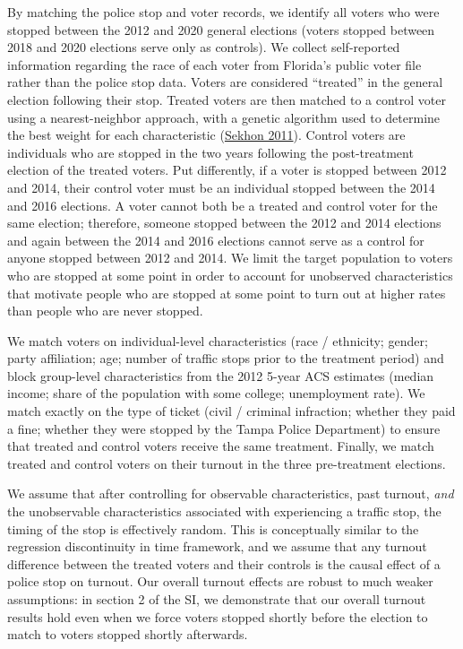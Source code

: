 \documentclass[
  12pt,
]{article}
\begin{document}
By matching the police stop and voter records, we identify all voters who were stopped between the 2012 and 2020 general elections (voters stopped between 2018 and 2020 elections serve only as controls). We collect self-reported information regarding the race of each voter from Florida's public voter file rather than the police stop data. Voters are considered ``treated'' in the general election following their stop. Treated voters are then matched to a control voter using a nearest-neighbor approach, with a genetic algorithm used to determine the best weight for each characteristic (\protect\hyperlink{ref-Sekhon2011}{Sekhon 2011}). Control voters are individuals who are stopped in the two years following the post-treatment election of the treated voters. Put differently, if a voter is stopped between 2012 and 2014, their control voter must be an individual stopped between the 2014 and 2016 elections. A voter cannot both be a treated and control voter for the same election; therefore, someone stopped between the 2012 and 2014 elections and again between the 2014 and 2016 elections cannot serve as a control for anyone stopped between 2012 and 2014. We limit the target population to voters who are stopped at some point in order to account for unobserved characteristics that motivate people who are stopped at some point to turn out at higher rates than people who are never stopped.

We match voters on individual-level characteristics (race / ethnicity; gender; party affiliation; age; number of traffic stops prior to the treatment period) and block group-level characteristics from the 2012 5-year ACS estimates (median income; share of the population with some college; unemployment rate). We match exactly on the type of ticket (civil / criminal infraction; whether they paid a fine; whether they were stopped by the Tampa Police Department) to ensure that treated and control voters receive the same treatment. Finally, we match treated and control voters on their turnout in the three pre-treatment elections.

We assume that after controlling for observable characteristics, past turnout, \emph{and} the unobservable characteristics associated with experiencing a traffic stop, the timing of the stop is effectively random. This is conceptually similar to the regression discontinuity in time framework, and we assume that any turnout difference between the treated voters and their controls is the causal effect of a police stop on turnout. Our overall turnout effects are robust to much weaker assumptions: in section 2 of the SI, we demonstrate that our overall turnout results hold even when we force voters stopped shortly before the election to match to voters stopped shortly afterwards.
\end{document}
